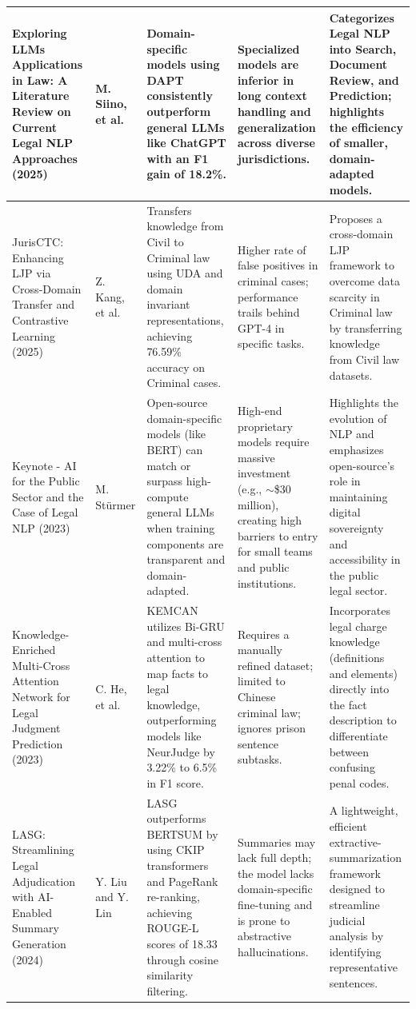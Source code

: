 {\begin{longtable}{|p{}|p{}|>{\raggedright\arraybackslash}p{}|>{\raggedright\arraybackslash}p{}|>{\raggedright\arraybackslash}p{}|}
Exploring LLMs Applications in Law: A Literature Review on Current Legal NLP Approaches (2025)~\cite{b13} & 
M. Siino, et al. & 
Domain-specific models using DAPT consistently outperform general LLMs like ChatGPT with an F1 gain of 18.2\%. & 
Specialized models are inferior in long context handling and generalization across diverse jurisdictions. & 
Categorizes Legal NLP into Search, Document Review, and Prediction; highlights the efficiency of smaller, domain-adapted models. \\ \hline


JurisCTC: Enhancing LJP via Cross-Domain Transfer and Contrastive Learning (2025)~\cite{b14} & 
Z. Kang, et al. & 
Transfers knowledge from Civil to Criminal law using UDA and domain invariant representations, achieving 76.59\% accuracy on Criminal cases. & 
Higher rate of false positives in criminal cases; performance trails behind GPT-4 in specific tasks. & 
Proposes a cross-domain LJP framework to overcome data scarcity in Criminal law by transferring knowledge from Civil law datasets. \\ \hline


Keynote - AI for the Public Sector and the Case of Legal NLP (2023)~\cite{b15} & 
M. Stürmer & 
Open-source domain-specific models (like BERT) can match or surpass high-compute general LLMs when training components are transparent and domain-adapted. & 
High-end proprietary models require massive investment (e.g., $\sim$\$30 million), creating high barriers to entry for small teams and public institutions. & 
Highlights the evolution of NLP and emphasizes open-source's role in maintaining digital sovereignty and accessibility in the public legal sector. \\ \hline


Knowledge-Enriched Multi-Cross Attention Network for Legal Judgment Prediction (2023)~\cite{b16} & 
C. He, et al. & 
KEMCAN utilizes Bi-GRU and multi-cross attention to map facts to legal knowledge, outperforming models like NeurJudge by 3.22\% to 6.5\% in F1 score. & 
Requires a manually refined dataset; limited to Chinese criminal law; ignores prison sentence subtasks. & 
Incorporates legal charge knowledge (definitions and elements) directly into the fact description to differentiate between confusing penal codes. \\ \hline


LASG: Streamlining Legal Adjudication with AI-Enabled Summary Generation (2024)~\cite{b17} & 
Y. Liu and Y. Lin & 
LASG outperforms BERTSUM by using CKIP transformers and PageRank re-ranking, achieving ROUGE-L scores of 18.33 through cosine similarity filtering. & 
Summaries may lack full depth; the model lacks domain-specific fine-tuning and is prone to abstractive hallucinations. & 
A lightweight, efficient extractive-summarization framework designed to streamline judicial analysis by identifying representative sentences. \\ \hline



\end{longtable}}
